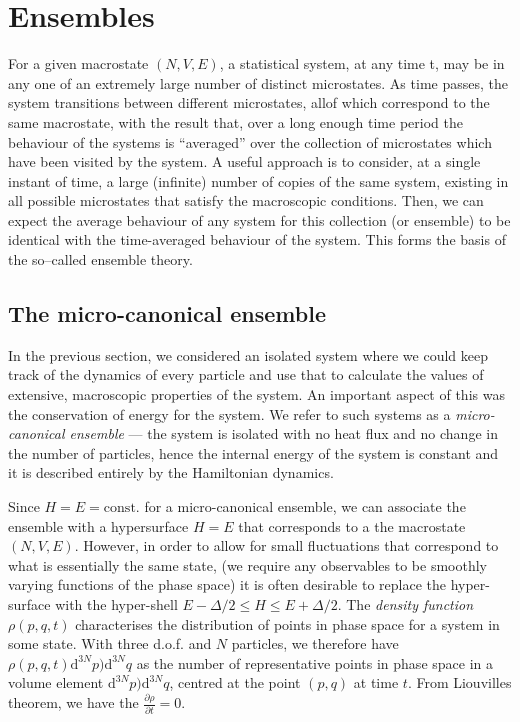 \section{Ensembles}

For a given macrostate $(N, V, E)$, a statistical system, at any time t, may be in any one of an extremely large number of distinct microstates. As time passes, the system transitions between different microstates, allof which correspond to the same macrostate, with the result that, over a long enough time period the behaviour of the systems is ``averaged'' over the collection of microstates which have been visited by the system.
A useful approach is to consider, at a single instant of time, a large (infinite) number of copies of the same system, existing in all possible microstates that satisfy the macroscopic conditions. Then, we can expect the average behaviour of any system for this collection (or ensemble) to be identical with the time-averaged behaviour of the system. This forms the basis of the so–called ensemble theory.

\subsection{The micro-canonical ensemble}
In the previous section, we considered an isolated system where we could keep track of the dynamics of every particle and use that to calculate the values of extensive, macroscopic properties of the system. An important aspect of this was the conservation of energy for the system. We refer to such systems as a \emph{micro-canonical ensemble} --- the system is isolated with no heat flux and no change in the number of particles, hence the internal energy of the system is constant and it is described entirely by the Hamiltonian dynamics.

Since $H=E=\mbox{const.}$ for a micro-canonical ensemble, we can associate the ensemble with a hypersurface $H=E$ that corresponds to a the macrostate $(N,V,E)$. However, in order to allow for small fluctuations that correspond to what is essentially the same state, (we require any observables to be smoothly varying functions of the phase space) it is often desirable to replace the hyper-surface with the hyper-shell $E-\Delta/2 \leq H \leq E+\Delta/2$. The \emph{density function} $\rho(p,q,t)$ characterises the distribution of points in phase space for a system in some state. With three d.o.f. and $N$ particles, we therefore have $\rho(p,q,t)\mathrm{d}^{3N}p)\mathrm{d}^{3N}q$ as the number of representative points in phase space in a volume element $\mathrm{d}^{3N}p)\mathrm{d}^{3N}q$, centred at the point $(p,q)$ at time $t$. From Liouvilles theorem, we have the $\frac{\partial \rho}{\partial t}=0$. 

